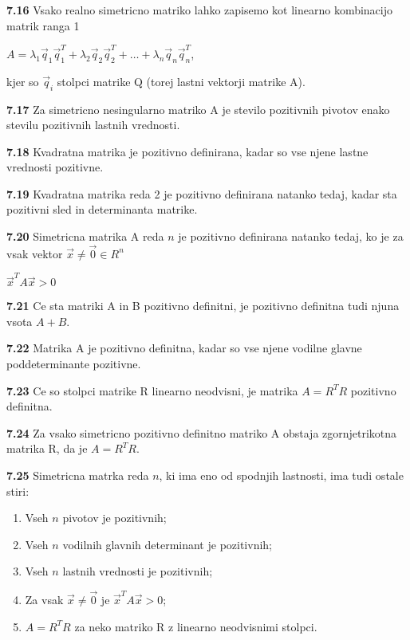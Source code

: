 \documentclass{article}
\begin{document}
\begin{multicols}{3}
\textbf{7.16} Vsako realno simetricno matriko lahko zapisemo kot linearno kombinacijo matrik ranga 1
\begin{center}
    \begin{math}
        A = \lambda_{1}\vec{q}_{1}\vec{q}_{1}^{T} + \lambda_{2}\vec{q}_{2}\vec{q}_{2}^{T} +
        \dots + \lambda_{n}\vec{q}_{n}\vec{q}_{n}^{T} 
    \end{math},
\end{center}
kjer so $\vec{q}_{i}$ stolpci matrike Q (torej lastni vektorji matrike A).

\textbf{7.17} Za simetricno nesingularno matriko A je stevilo pozitivnih pivotov enako
stevilu pozitivnih lastnih vrednosti.

\textbf{7.18} Kvadratna matrika je pozitivno definirana, kadar so vse njene lastne vrednosti pozitivne.

\textbf{7.19} Kvadratna matrika reda 2 je pozitivno definirana natanko tedaj, kadar sta 
pozitivni sled in determinanta matrike.

\textbf{7.20} Simetricna matrika A reda $n$ je pozitivno definirana natanko tedaj, ko je za vsak
vektor $\vec{x} \neq \vec{0} \in R^{n}$
\begin{center}
    $\vec{x}^{T}A\vec{x} > 0$
\end{center}

\textbf{7.21} Ce sta matriki A in B pozitivno definitni, je pozitivno definitna tudi 
njuna vsota $A + B$.

\textbf{7.22} Matrika A je pozitivno definitna, kadar so vse njene vodilne glavne poddeterminante pozitivne.

\textbf{7.23} Ce so stolpci matrike R linearno neodvisni, je matrika $A = R^{T}R$ pozitivno definitna.

\textbf{7.24} Za vsako simetricno pozitivno definitno matriko A obstaja zgornjetrikotna matrika R, da
je $A = R^{T}R$.

\textbf{7.25} Simetricna matrka reda $n$, ki ima eno od spodnjih lastnosti, ima tudi ostale stiri:
\begin{enumerate}
    \item Vseh $n$ pivotov je pozitivnih;
    \item Vseh $n$ vodilnih glavnih determinant je pozitivnih;
    \item Vseh $n$ lastnih vrednosti je pozitivnih;
    \item Za vsak $\vec{x} \neq \vec{0}$ je $\vec{x}^{T}A\vec{x} > 0$;
    \item $A= R^{T}R$ za neko matriko R z linearno neodvisnimi stolpci.
\end{enumerate}


\end{multicols}
\end{document}
